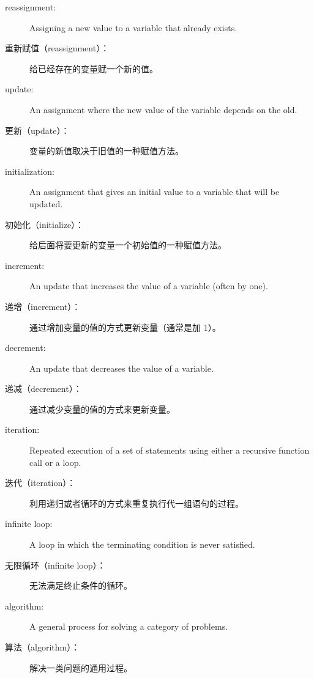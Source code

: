 \begin{description}

\item[reassignment:] Assigning a new value to a variable that
already exists.

\item[重新赋值（reassignment）：] 给已经存在的变量赋一个新的值。

\item[update:] An assignment where the new value of the variable
depends on the old.

\item[更新（update）：] 变量的新值取决于旧值的一种赋值方法。

\item[initialization:] An assignment that gives an initial value to
a variable that will be updated.

\item[初始化（initialize）：] 给后面将要更新的变量一个初始值的一种赋值方法。

\item[increment:] An update that increases the value of a variable
(often by one).

\item[递增（increment）：] 通过增加变量的值的方式更新变量（通常是加 1）。

\item[decrement:] An update that decreases the value of a variable.

\item[递减（decrement）：] 通过减少变量的值的方式来更新变量。

\item[iteration:] Repeated execution of a set of statements using
either a recursive function call or a loop.

\item[迭代（iteration）：] 利用递归或者循环的方式来重复执行代一组语句的过程。

\item[infinite loop:] A loop in which the terminating condition is
never satisfied.

\item[无限循环（infinite loop）：] 无法满足终止条件的循环。

\item[algorithm:]  A general process for solving a category of
problems.

\item[算法（algorithm）：] 解决一类问题的通用过程。

\end{description}


